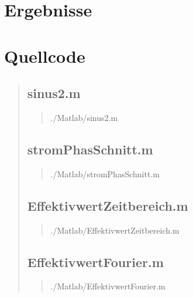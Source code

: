 
\section{Ergebnisse}
\begin{quote}
	
\end{quote}

\section{Quellcode}
\begin{quote}
    \subsection{sinus2.m}
    \begin{quote}
        
            {./Matlab/sinus2.m}
    \end{quote}
    \subsection{stromPhasSchnitt.m}
    \begin{quote}
        
            {./Matlab/stromPhasSchnitt.m}
    \end{quote}
    \subsection{EffektivwertZeitbereich.m}
    \begin{quote}
        
            {./Matlab/EffektivwertZeitbereich.m}
    \end{quote}
    \subsection{EffektivwertFourier.m}
    \begin{quote}
        
            {./Matlab/EffektivwertFourier.m}
    \end{quote}
	
\end{quote}

